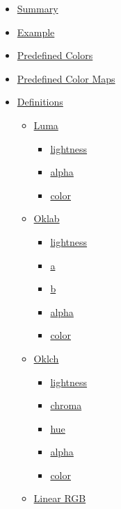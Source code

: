 \begin{itemize}
\tightlist
\item
  \hyperref[summary]{Summary}
\item
  \hyperref[example]{Example}
\item
  \hyperref[predefined-colors]{Predefined Colors}
\item
  \hyperref[predefined-color-maps]{Predefined Color Maps}
\item
  \hyperref[definitions]{Definitions}

  \begin{itemize}
  \tightlist
  \item
    \hyperref[definitions-luma]{Luma}

    \begin{itemize}
    \tightlist
    \item
      \hyperref[definitions-luma-lightness]{lightness}
    \item
      \hyperref[definitions-luma-alpha]{alpha}
    \item
      \hyperref[definitions-luma-color]{color}
    \end{itemize}
  \item
    \hyperref[definitions-oklab]{Oklab}

    \begin{itemize}
    \tightlist
    \item
      \hyperref[definitions-oklab-lightness]{lightness}
    \item
      \hyperref[definitions-oklab-a]{a}
    \item
      \hyperref[definitions-oklab-b]{b}
    \item
      \hyperref[definitions-oklab-alpha]{alpha}
    \item
      \hyperref[definitions-oklab-color]{color}
    \end{itemize}
  \item
    \hyperref[definitions-oklch]{Oklch}

    \begin{itemize}
    \tightlist
    \item
      \hyperref[definitions-oklch-lightness]{lightness}
    \item
      \hyperref[definitions-oklch-chroma]{chroma}
    \item
      \hyperref[definitions-oklch-hue]{hue}
    \item
      \hyperref[definitions-oklch-alpha]{alpha}
    \item
      \hyperref[definitions-oklch-color]{color}
    \end{itemize}
  \item
    \hyperref[definitions-linear-rgb]{Linear RGB}


\end{itemize}
\end{itemize}
